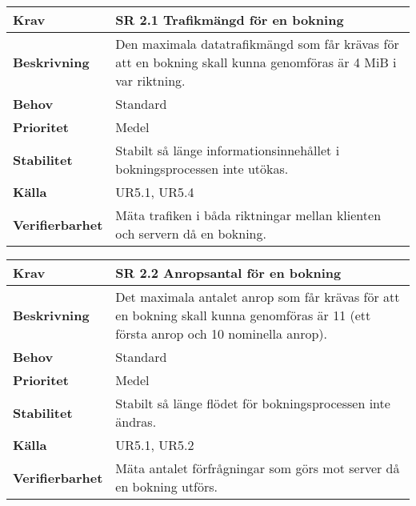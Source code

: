 \documentclass[a4paper, twoside, 11pt, titlepage]{article}
\begin{document}
\begin{tabular} { p{2.6cm} p{12.5cm} }
	\hline
	\sffamily\textbf{Krav} & \sffamily\textbf{SR 2.1 Trafikmängd för en bokning } \\
	\hline
	\sffamily\textbf{Beskrivning} & Den maximala datatrafikmängd som får krävas för att en bokning skall kunna genomföras är 4 MiB i var riktning.  \\
	\hline
	\sffamily\textbf{Behov} & Standard  \\
	\hline
	\sffamily\textbf{Prioritet} & Medel  \\
	\hline
	\sffamily\textbf{Stabilitet} & Stabilt så länge informationsinnehållet i bokningsprocessen inte utökas.  \\
	\hline
	\sffamily\textbf{Källa} & UR5.1, UR5.4  \\
	\hline
	\sffamily\textbf{Verifierbarhet} & Mäta trafiken i båda riktningar mellan klienten och servern då en bokning.  \\
	\hline
\end{tabular}
\vspace{6mm}

\begin{tabular} { p{2.6cm} p{12.5cm} }
	\hline
	\sffamily\textbf{Krav} & \sffamily\textbf{SR 2.2 Anropsantal för en bokning } \\
	\hline
	\sffamily\textbf{Beskrivning} & Det maximala antalet anrop som får krävas för att en bokning skall kunna genomföras är 11 (ett första anrop och 10 nominella anrop).  \\
	\hline
	\sffamily\textbf{Behov} & Standard  \\
	\hline
	\sffamily\textbf{Prioritet} & Medel  \\
	\hline
	\sffamily\textbf{Stabilitet} & Stabilt så länge flödet för bokningsprocessen inte ändras.  \\
	\hline
	\sffamily\textbf{Källa} & UR5.1, UR5.2  \\
	\hline
	\sffamily\textbf{Verifierbarhet} & Mäta antalet förfrågningar som görs mot server då en bokning utförs.  \\
	\hline
\end{tabular}
\vspace{6mm}
\end{document}
